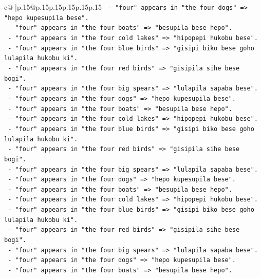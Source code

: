 \documentclass{article}
\begin{document}
{\begin{supertabular}{c@{$\;$}|p{.15\linewidth}@{}p{.15\linewidth}p{.15\linewidth}p{.15\linewidth}p{.15\linewidth}p{.15\linewidth}}
{{{\texttt{           {-} "four" appears in "the four dogs" => "hepo kupesupila bese".} \\
\texttt{           {-} "four" appears in "the four boats" => "besupila bese hepo".} \\
\texttt{           {-} "four" appears in "the four cold lakes" => "hipopepi hukobu bese".} \\
\texttt{           {-} "four" appears in "the four blue birds" => "gisipi biko bese goho lulapila hukobu ki".} \\
\texttt{           {-} "four" appears in "the four red birds" => "gisipila sihe bese bogi".} \\
\texttt{           {-} "four" appears in "the four big spears" => "lulapila sapaba bese".} \\
\texttt{           {-} "four" appears in "the four dogs" => "hepo kupesupila bese".} \\
\texttt{           {-} "four" appears in "the four boats" => "besupila bese hepo".} \\
\texttt{           {-} "four" appears in "the four cold lakes" => "hipopepi hukobu bese".} \\
\texttt{           {-} "four" appears in "the four blue birds" => "gisipi biko bese goho lulapila hukobu ki".} \\
\texttt{           {-} "four" appears in "the four red birds" => "gisipila sihe bese bogi".} \\
\texttt{           {-} "four" appears in "the four big spears" => "lulapila sapaba bese".} \\
\texttt{           {-} "four" appears in "the four dogs" => "hepo kupesupila bese".} \\
\texttt{           {-} "four" appears in "the four boats" => "besupila bese hepo".} \\
\texttt{           {-} "four" appears in "the four cold lakes" => "hipopepi hukobu bese".} \\
\texttt{           {-} "four" appears in "the four blue birds" => "gisipi biko bese goho lulapila hukobu ki".} \\
\texttt{           {-} "four" appears in "the four red birds" => "gisipila sihe bese bogi".} \\
\texttt{           {-} "four" appears in "the four big spears" => "lulapila sapaba bese".} \\
\texttt{           {-} "four" appears in "the four dogs" => "hepo kupesupila bese".} \\
\texttt{           {-} "four" appears in "the four boats" => "besupila bese hepo".} \\
}}}
\end{supertabular}}
\end{document}
